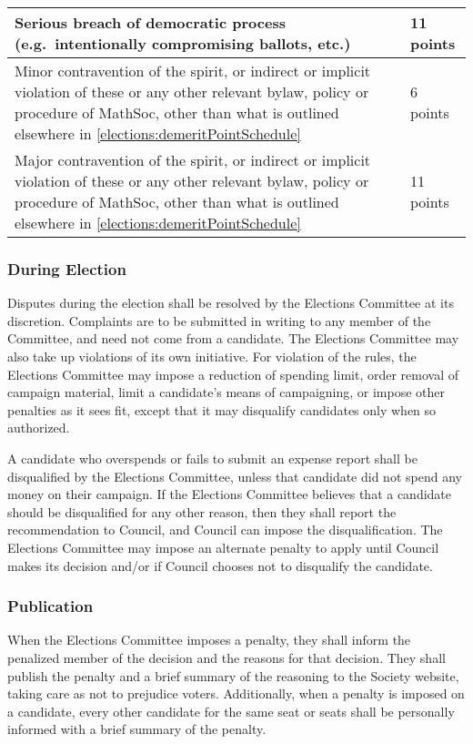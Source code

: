 \begin{center}
\begin{tabular}{| p{11.5cm} | p{4cm} |}
		\hline 
		Serious breach of democratic process (e.g.\ intentionally compromising ballots, etc.) & 11 points \\ 
		\hline
		Minor contravention of the spirit, or indirect or implicit violation of these or any other relevant bylaw, policy or procedure of MathSoc, other than what is outlined elsewhere in \cref{elections:demeritPointSchedule} & 6 points \\
		\hline
		Major contravention of the spirit, or indirect or implicit violation of these or any other relevant bylaw, policy or procedure of MathSoc, other than what is outlined elsewhere in \cref{elections:demeritPointSchedule} & 11 points \\
		\hline
	\end{tabular}
\end{center}

\subsubsection{During Election}
Disputes during the election shall be resolved by the Elections Committee at its discretion.
Complaints are to be submitted in writing to any member of the Committee, and need not come from a candidate.
The Elections Committee may also take up violations of its own initiative.
For violation of the rules, the Elections Committee may impose a reduction of spending limit, order removal of campaign material, limit a candidate's means of campaigning, or impose other penalties as it sees fit, except that it may disqualify candidates only when so authorized.

A candidate who overspends or fails to submit an expense report shall be disqualified by the Elections Committee, unless that candidate did not spend any money on their campaign.
If the Elections Committee believes that a candidate should be disqualified for any other reason, then they shall report the recommendation to Council, and Council can impose the disqualification.
The Elections Committee may impose an alternate penalty to apply until Council makes its decision and/or if Council chooses not to disqualify the candidate.

\subsubsection{Publication}
When the Elections Committee imposes a penalty, they shall inform the penalized member of the decision and the reasons for that decision.
They shall publish the penalty and a brief summary of the reasoning to the Society website, taking care as not to prejudice voters.
Additionally, when a penalty is imposed on a candidate, every other candidate for the same seat or seats shall be personally informed with a brief summary of the penalty.

